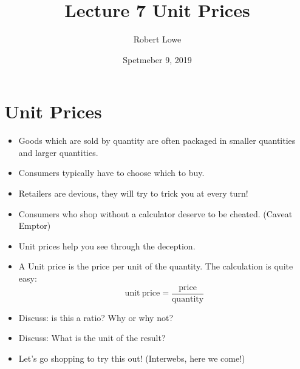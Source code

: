 \documentclass{article}
\title{Lecture 7 Unit Prices}
\author{Robert Lowe}
\date{Spetmeber 9, 2019}
\begin{document}
\maketitle

\section*{Unit Prices}
\begin{itemize}
\item Goods which are sold by quantity are often packaged in smaller quantities and larger quantities.
\item Consumers typically have to choose which to buy.
\item Retailers are devious, they will try to trick you at every turn!
\item Consumers who shop without a calculator deserve to be cheated. (Caveat Emptor)
\item Unit prices help you see through the deception.
\item A Unit price is the price per unit of the quantity.  The calculation is quite easy:\newline
\[
    \mathrm{unit\ price} = \dfrac{\mathrm{price}}{\mathrm{quantity}}
\]
\item Discuss: is this a ratio? Why or why not?
\item Discuss: What is the unit of the result?
\item Let's go shopping to try this out!  (Interwebs, here we come!)
\end{itemize}
\end{document}
